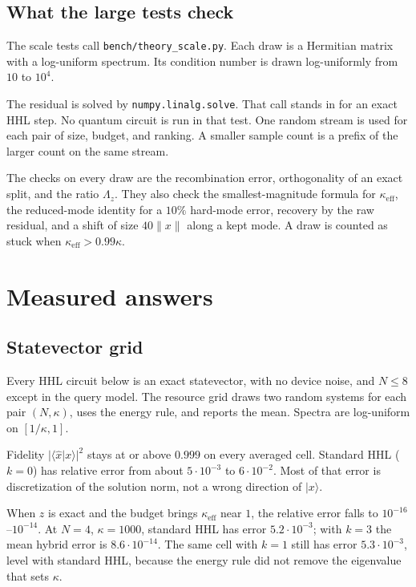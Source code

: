 \documentclass[11pt,a4paper]{article}
\begin{document}
\subsection{What the large tests check}
The scale tests call \texttt{bench/theory\_scale.py}.
Each draw is a Hermitian matrix with a log-uniform spectrum.
Its condition number is drawn log-uniformly from \(10\) to \(10^{4}\).

The residual is solved by \texttt{numpy.linalg.solve}.
That call stands in for an exact HHL step.
No quantum circuit is run in that test.
One random stream is used for each pair of size, budget, and ranking.
A smaller sample count is a prefix of the larger count on the same stream.

The checks on every draw are the recombination error, orthogonality of an exact split, and the ratio \(\Lambda_z\).
They also check the smallest-magnitude formula for \(\kappa_{\mathrm{eff}}\), the reduced-mode identity for a \(10\%\) hard-mode error, recovery by the raw residual, and a shift of size \(40\lVert x\rVert\) along a kept mode.
A draw is counted as stuck when \(\kappa_{\mathrm{eff}}>0.99\kappa\).

\section{Measured answers}

\subsection{Statevector grid}
Every HHL circuit below is an exact statevector, with no device noise, and \(N\le 8\) except in the query model.
The resource grid draws two random systems for each pair \((N,\kappa)\), uses the energy rule, and reports the mean.
Spectra are log-uniform on \([1/\kappa,1]\).

Fidelity \(\lvert\langle\hat x\vert x\rangle\rvert^2\) stays at or above \(0.999\) on every averaged cell.
Standard HHL (\(k=0\)) has relative error from about \(5\cdot 10^{-3}\) to \(6\cdot 10^{-2}\).
Most of that error is discretization of the solution norm, not a wrong direction of \(\lvert x\rangle\).

When \(z\) is exact and the budget brings \(\kappa_{\mathrm{eff}}\) near \(1\), the relative error falls to \(10^{-16}\)--\(10^{-14}\).
At \(N=4\), \(\kappa=1000\), standard HHL has error \(5.2\cdot 10^{-3}\); with \(k=3\) the mean hybrid error is \(8.6\cdot 10^{-14}\).
The same cell with \(k=1\) still has error \(5.3\cdot 10^{-3}\), level with standard HHL, because the energy rule did not remove the eigenvalue that sets \(\kappa\).
\end{document}
